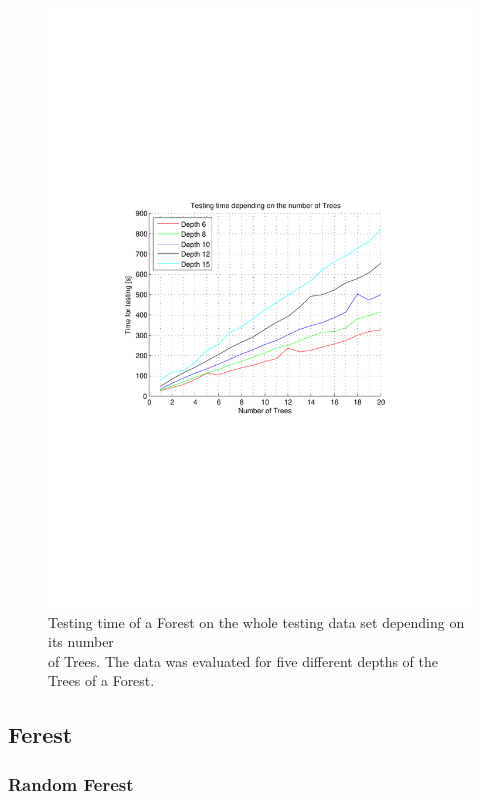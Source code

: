 \documentclass[twocolumn]{article}
\begin{document}
\begin{figure}[t] 
\centering
\includegraphics{Diagrams/Forests_Testing_Times_Gini_15_20}
\caption{Testing time of a Forest on the whole testing data set depending on its number\\\phantom{Figure 2: }of Trees. The data was evaluated for five different depths of the Trees of a Forest.}
\label{forest_testing_time}
\end{figure}
\twocolumn





\subsection{Ferest}

\subsubsection{Random Ferest}
\end{document}
